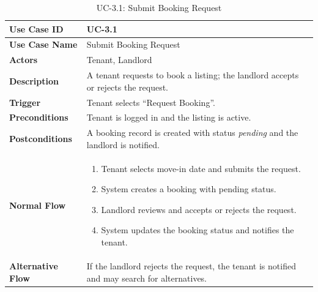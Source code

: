 \begin{table}[h]
\centering
\caption{UC-3.1: Submit Booking Request}

\begin{tabularx}{\textwidth}{
|>{\raggedright\arraybackslash}p{3.5cm}
|>{\raggedright\arraybackslash}X|}

\hline
\textbf{Use Case ID} & UC-3.1 \\ \hline
\textbf{Use Case Name} & Submit Booking Request \\ \hline
\textbf{Actors} & Tenant, Landlord \\ \hline
\textbf{Description} & A tenant requests to book a listing; the landlord accepts or rejects the request. \\ \hline
\textbf{Trigger} & Tenant selects ``Request Booking''. \\ \hline
\textbf{Preconditions} & Tenant is logged in and the listing is active. \\ \hline
\textbf{Postconditions} & A booking record is created with status \textit{pending} and the landlord is notified. \\ \hline
\textbf{Normal Flow} &
\begin{enumerate}
    \item Tenant selects move-in date and submits the request.
    \item System creates a booking with pending status.
    \item Landlord reviews and accepts or rejects the request.
    \item System updates the booking status and notifies the tenant.
\end{enumerate}
\\ \hline
\textbf{Alternative Flow} &
If the landlord rejects the request, the tenant is notified and may search for alternatives.
\\ \hline

\end{tabularx}

\end{table}

